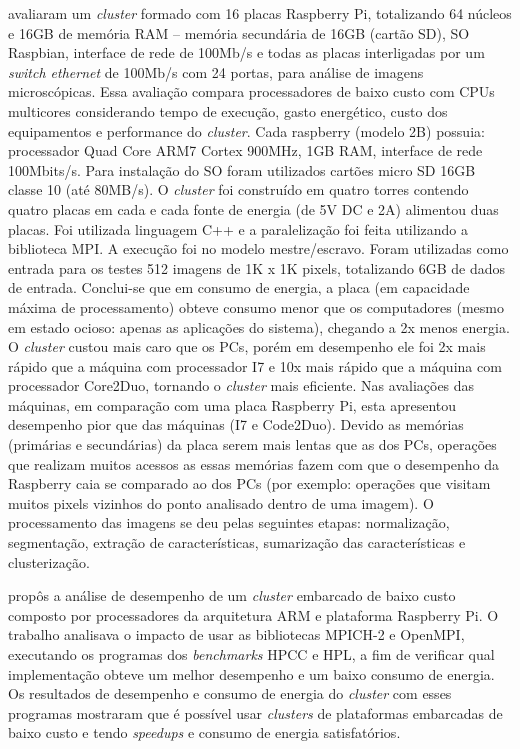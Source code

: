 \citet{ramos:2016:avaliacao}  avaliaram um \textit{cluster} formado com 16 placas Raspberry Pi, totalizando 64 núcleos e 16GB de memória RAM – memória secundária de 16GB (cartão SD), SO Raspbian, interface de rede de 100Mb/s e todas as placas interligadas por um \textit{switch ethernet} de 100Mb/s com 24 portas, para análise de imagens microscópicas. Essa avaliação compara processadores de baixo custo com CPUs multicores considerando tempo de execução, gasto energético, custo dos equipamentos e performance do \textit{cluster}. Cada raspberry (modelo 2B) possuia: processador Quad Core ARM7 Cortex 900MHz, 1GB RAM, interface de rede 100Mbits/s. Para instalação do SO foram utilizados cartões micro SD 16GB classe 10 (até 80MB/s). O \textit{cluster} foi construído em quatro torres contendo quatro placas em cada e cada fonte de energia (de 5V DC e 2A) alimentou duas placas. Foi utilizada linguagem C++ e a paralelização foi feita utilizando a biblioteca MPI. A execução foi no modelo mestre/escravo. Foram utilizadas como entrada para os testes 512 imagens de 1K x 1K pixels, totalizando 6GB de dados de entrada. Conclui-se que em consumo de energia, a placa (em capacidade máxima de processamento) obteve consumo menor que os computadores (mesmo em estado ocioso: apenas as aplicações do sistema), chegando a 2x menos energia. O \textit{cluster} custou mais caro que os PCs, porém em desempenho ele foi 2x mais rápido que a máquina com processador I7 e 10x mais rápido que a máquina com processador Core2Duo, tornando o \textit{cluster} mais eficiente. Nas avaliações das máquinas, em comparação com uma placa Raspberry Pi, esta apresentou desempenho pior que das máquinas (I7 e Code2Duo). Devido as memórias (primárias e secundárias) da placa serem mais lentas que as dos PCs, operações que realizam muitos acessos as essas memórias fazem com que o desempenho da Raspberry caia se comparado ao dos PCs (por exemplo: operações que visitam muitos pixels vizinhos do ponto analisado dentro de uma imagem). O processamento das imagens se deu pelas seguintes etapas: normalização, segmentação, extração de características, sumarização das características e clusterização.

\citet{lima:2016:implantacao} propôs a análise de desempenho de um \textit{cluster} embarcado de baixo custo composto por processadores da arquitetura ARM e plataforma Raspberry Pi. O trabalho analisava o impacto de usar as bibliotecas MPICH-2 e OpenMPI, executando os programas dos \textit{benchmarks}  HPCC e HPL, a fim de verificar qual implementação obteve um melhor desempenho e um baixo consumo de energia. Os resultados de desempenho e consumo de energia do \textit{cluster} com esses programas mostraram que é possível usar \textit{clusters} de plataformas embarcadas de baixo custo e tendo \textit{speedups} e consumo de energia satisfatórios. 

